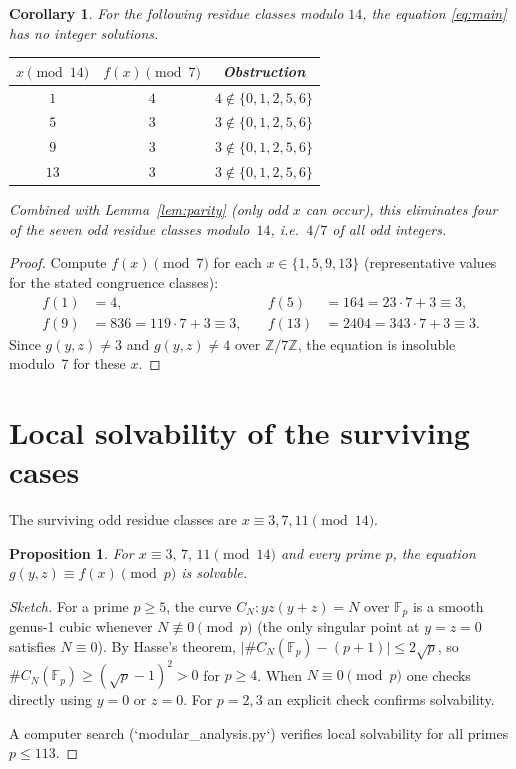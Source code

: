 \documentclass[12pt, a4paper]{article}
\newtheorem{corollary}[theorem]{Corollary}
\newtheorem{proposition}[theorem]{Proposition}
\theoremstyle{definition}
\newcommand{\Z}{\mathbb{Z}}
\newcommand{\F}{\mathbb{F}}
\begin{document}
\begin{corollary}\label{cor:mod7}
For the following residue classes modulo $14$, the equation \eqref{eq:main}
has no integer solutions.
\begin{center}
\begin{tabular}{ccc}
\toprule
$x \pmod{14}$ & $f(x)\pmod7$ & Obstruction \\\midrule
$1$  & $4$ & $4\notin\{0,1,2,5,6\}$ \\
$5$  & $3$ & $3\notin\{0,1,2,5,6\}$ \\
$9$  & $3$ & $3\notin\{0,1,2,5,6\}$ \\
$13$ & $3$ & $3\notin\{0,1,2,5,6\}$ \\\bottomrule
\end{tabular}
\end{center}
Combined with Lemma~\ref{lem:parity} (only odd $x$ can occur), this
eliminates \emph{four of the seven odd residue classes modulo~$14$},
i.e.\ $4/7$ of all odd integers.
\end{corollary}

\begin{proof}
Compute $f(x)\pmod7$ for each $x\in\{1,5,9,13\}$ (representative values
for the stated congruence classes):
\begin{align*}
  f(1)  &= 4,\quad &f(5) &= 164 = 23\cdot7+3\equiv3,\\
  f(9)  &= 836 = 119\cdot7+3\equiv3,\quad &f(13) &= 2404 = 343\cdot7+3\equiv3.
\end{align*}
Since $g(y,z)\ne3$ and $g(y,z)\ne4$ over $\Z/7\Z$, the equation is
insoluble modulo~7 for these $x$.
\end{proof}

\section{Local solvability of the surviving cases}
\label{sec:local}

The surviving odd residue classes are $x\equiv 3,7,11\pmod{14}$.

\begin{proposition}
For $x\equiv3,\,7,\,11\pmod{14}$ and every prime $p$, the equation
$g(y,z)\equiv f(x)\pmod{p}$ is solvable.
\end{proposition}

\begin{proof}[Sketch]
For a prime $p\ge5$, the curve $C_N: yz(y+z)=N$ over $\F_p$ is a smooth
genus-1 cubic whenever $N\not\equiv0\pmod{p}$ (the only singular point
at $y=z=0$ satisfies $N\equiv0$).   By Hasse's theorem,
$\lvert\#C_N(\F_p)-(p+1)\rvert\le2\sqrt{p}$, so $\#C_N(\F_p)\ge(\sqrt p-1)^2>0$
for $p\ge4$.  When $N\equiv0\pmod p$ one checks directly using $y=0$ or $z=0$.
For $p=2,3$ an explicit check confirms solvability.

A computer search (`modular\_analysis.py`) verifies local solvability for
all primes $p\le113$.
\end{proof}
\end{document}
